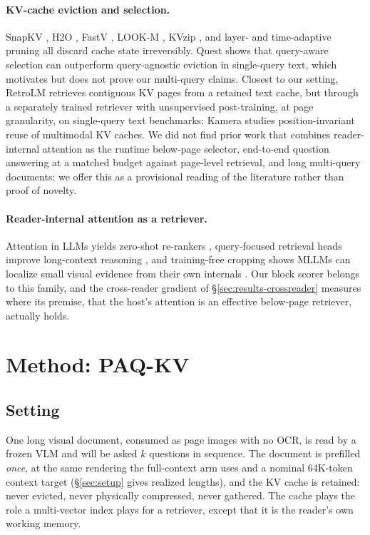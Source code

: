 \documentclass[letterpaper]{article} %
\newcommand{\paqc}{\textsc{PAQ-KV}}
\begin{document}
\paragraph{KV-cache eviction and selection.} SnapKV \citep{li2024snapkv},
H2O \citep{zhang2023h2o}, FastV \citep{chen2024fastv}, LOOK-M
\citep{wan2024lookm}, KVzip \citep{kim2025kvzip}, and layer- and
time-adaptive pruning \citep{zeng2026lethe} all discard cache state
irreversibly. Quest \citep{tang2024quest} shows that query-aware selection
can outperform query-agnostic eviction in single-query text, which motivates
but does not prove our multi-query claims. Closest to our setting, RetroLM
\citep{luo2026retrolm} retrieves contiguous KV pages from a retained text
cache, but through a separately trained retriever with unsupervised
post-training, at page granularity, on single-query text benchmarks; Kamera
\citep{kamera2026} studies position-invariant reuse of multimodal KV caches.
We did not find prior work that combines reader-internal attention as the
runtime below-page selector, end-to-end question answering at a matched
budget against page-level retrieval, and long multi-query documents; we
offer this as a provisional reading of the literature rather than proof of
novelty.

\paragraph{Reader-internal attention as a retriever.} Attention in LLMs
yields zero-shot re-rankers \citep{chen2025icr}, query-focused retrieval
heads improve long-context reasoning \citep{wu2025qrhead}, and training-free
cropping shows MLLMs can localize small visual evidence from their own
internals \citep{vicrop2025}. Our block scorer belongs to this family, and
the cross-reader gradient of \S\ref{sec:results-crossreader} measures where
its premise, that the host's attention is an effective below-page retriever,
actually holds.

\section{Method: \paqc{}}\label{sec:method}

\subsection{Setting}
One long visual document, consumed as page images with no OCR, is read by a
frozen VLM and will be asked $k$ questions in sequence. The document is
prefilled \emph{once}, at the same rendering the full-context arm uses and a
nominal 64K-token context target (\S\ref{sec:setup} gives realized lengths),
and the KV cache is retained: never evicted, never physically compressed,
never gathered. The cache plays the role a multi-vector index plays for a
retriever, except that it is the reader's own working memory.
\end{document}
